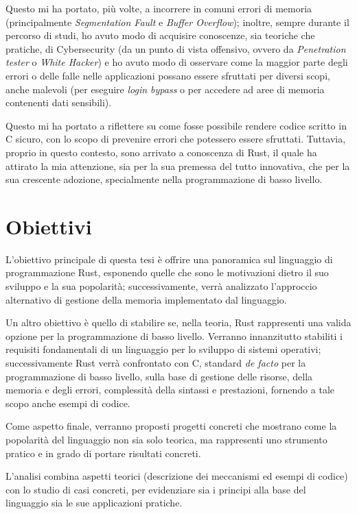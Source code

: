 Questo mi ha portato, più volte, a incorrere in comuni errori di memoria (principalmente \textit{Segmentation Fault} e \textit{Buffer Overflow});
inoltre, sempre durante il percorso di studi, ho avuto modo di acquisire conoscenze, sia teoriche che pratiche, di Cybersecurity (da un punto di vista offensivo, ovvero da \textit{Penetration tester} o \textit{White Hacker})
e ho avuto modo di osservare come la maggior parte degli errori o delle falle nelle applicazioni possano essere sfruttati per diversi scopi, anche malevoli (per eseguire \textit{login bypass} o per accedere ad aree di memoria contenenti dati sensibili).

Questo mi ha portato a riflettere su come fosse possibile rendere codice scritto in C sicuro, con lo scopo di prevenire 
errori che potessero essere sfruttati. Tuttavia, proprio in questo contesto, sono arrivato a 
conoscenza di Rust, il quale ha attirato la mia attenzione, sia per la sua premessa del tutto innovativa, che per la sua crescente adozione, specialmente nella 
programmazione di basso livello.



\section{Obiettivi} 
L'obiettivo principale di questa tesi è offrire una panoramica sul linguaggio 
di programmazione Rust, esponendo quelle che sono le motivazioni 
dietro il suo sviluppo e la sua popolarità; successivamente, verrà analizzato 
l'approccio alternativo di gestione della memoria implementato dal linguaggio.

Un altro obiettivo è quello di stabilire se, nella teoria, Rust rappresenti una valida 
opzione per la programmazione di basso livello. Verranno innanzitutto stabiliti i requisiti 
fondamentali di un linguaggio per lo sviluppo di sistemi operativi; successivamente Rust verrà 
confrontato con C, standard \textit{de facto} per la programmazione di basso 
livello, sulla base di gestione delle risorse, della memoria e degli errori, complessità della sintassi e 
prestazioni, fornendo a tale scopo anche esempi di codice.

Come aspetto finale, verranno proposti progetti 
concreti che mostrano come la popolarità del linguaggio non sia solo 
teorica, ma rappresenti uno strumento pratico e in grado di portare risultati concreti.

L'analisi combina aspetti teorici (descrizione dei meccanismi ed esempi di codice)
 con lo studio di casi concreti, per evidenziare sia i principi 
alla base del linguaggio sia le sue applicazioni pratiche. 

